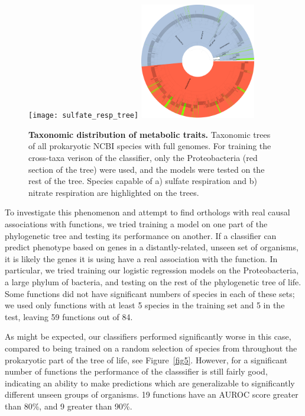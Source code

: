 \documentclass[10pt,letterpaper]{article}
\begin{document}
\begin{figure}
\texttt{[image: sulfate\_resp\_tree]}
\includegraphics[width=0.45\textwidth]{nitrate_resp_tree}
\caption{{\bf Taxonomic distribution of metabolic traits.}
Taxonomic trees of all prokaryotic NCBI species with full genomes. For training the cross-taxa verison of the classifier, only the Proteobacteria (red section of the tree) were used, and the models were tested on the rest of the tree. Species capable of a) sulfate respiration and b) nitrate respiration are highlighted on the trees.}
\label{fig4}
\end{figure}

To investigate this phenomenon and attempt to find orthologs with real causal associations with functions, we tried training a model on one part of the phylogenetic tree and testing its performance on another. If a classifier can predict phenotype based on genes in a distantly-related, unseen set of organisms, it is likely the genes it is using have a real association with the function. In particular, we tried training our logistic regression models on the Proteobacteria, a large phylum of bacteria, and testing on the rest of the phylogenetic tree of life. Some functions did not have significant numbers of species in each of these sets; we used only functions with at least 5 species in the training set and 5 in the test, leaving 59 functions out of 84. 

As might be expected, our classifiers performed significantly worse in this case, compared to being trained on a random selection of species from throughout the prokaryotic part of the tree of life, see Figure~\ref{fig5}. However, for a significant number of functions the performance of the classsifier is still fairly good, indicating an ability to make predictions which are generalizable to significantly different unseen groups of organisms. 19 functions have an AUROC score greater than 80\%, and 9 greater than 90\%. 
\end{document}
